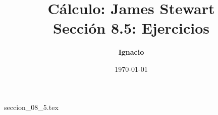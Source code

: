 \documentclass[11pt,spanish,oneside]{report}
\title{\textbf{Cálculo: James Stewart} \\ \Large Sección 8.5: Ejercicios}
\author{\textbf{Ignacio}}
\date{\today}
\begin{document}
\maketitle

{seccion_08_5.tex}
\end{document}
